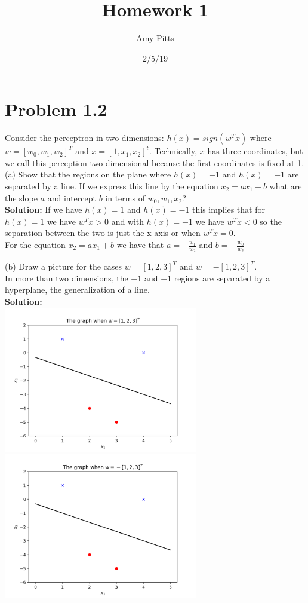 \documentclass[a4paper]{article}
\title{Homework 1}
\author{Amy Pitts}
\date{2/5/19}
\begin{document}
\lstset{language=Python}

\maketitle

\section{Problem 1.2}
Consider the perceptron in two dimensions: $h(x)=sign(w^Tx)$
where $w=[w_0,w_1,w_2]^T$ and $x=[1,x_1,x_2]^t$. 
Technically, $x$ has three coordinates, but we call this 
perception two-dimensional because the first coordinates 
is fixed at 1. \\
(a) Show that the regions on the plane where $h(x)=+1$
and $h(x)=-1$ are separated by a line. If we express
this line by the equation $x_2=ax_1+b$ what are 
the slope $a$ and intercept $b$ in terms of $w_0,w_1,x_2$? \\
\indent \textbf{Solution:} If we have $h(x)=1$ and $h(x)=-1$ this 
implies that for $h(x)=1$ we have $w^Tx>0$ and with $h(x)=-1$ we 
have $w^Tx<0$ so the separation between the two is just the 
x-axis or when $w^Tx=0$. \\
For the equation $x_2=ax_1+b$ we have that $a= -\frac{w_1}{w_2}$ and $b=-\frac{w_0}{w_2}$

(b) Draw a picture for the cases $w=[1,2,3]^T$ and $w=-[1,2,3]^T$. \\
In more than two dimensions, the $+1$ and $-1$ regions are
separated by a hyperplane, the generalization of a line. \\
\indent \textbf{Solution:} \\
\includegraphics[width=85mm]{positive.png}
\includegraphics[width=85mm]{negative.png} \\

\end{document}
